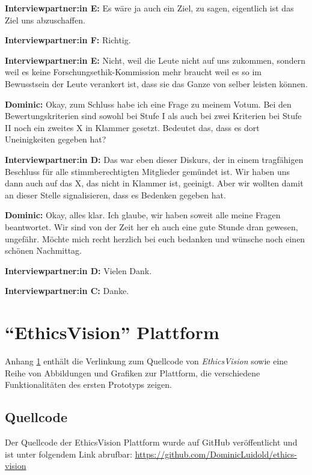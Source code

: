 \documentclass[a4paper,12pt,twoside]{scrreprt}
\begin{document}
\textbf{Interviewpartner:in E:} Es wäre ja auch ein Ziel, zu sagen, eigentlich ist das Ziel uns abzuschaffen.

\textbf{Interviewpartner:in F:} Richtig.

\textbf{Interviewpartner:in E:} Nicht, weil die Leute nicht auf uns zukommen, sondern weil es keine Forschungsethik-Kommission mehr braucht weil es so im Bewusstsein der Leute verankert ist, dass sie das Ganze von selber leisten können.

\textbf{Dominic:} Okay, zum Schluss habe ich eine Frage zu meinem Votum. Bei den Bewertungskriterien sind sowohl bei Stufe I als auch bei zwei Kriterien bei Stufe II noch ein zweites X in Klammer gesetzt. Bedeutet das, dass es dort Uneinigkeiten gegeben hat?

\textbf{Interviewpartner:in D:} Das war eben dieser Diskurs, der in einem tragfähigen Beschluss für alle stimmberechtigten Mitglieder gemündet ist. Wir haben uns dann auch auf das X, das nicht in Klammer ist, geeinigt. Aber wir wollten damit an dieser Stelle signalisieren, dass es Bedenken gegeben hat.

\textbf{Dominic:} Okay, alles klar. Ich glaube, wir haben soweit alle meine Fragen beantwortet. Wir sind von der Zeit her eh auch eine gute Stunde dran gewesen, ungefähr. Möchte mich recht herzlich bei euch bedanken und wünsche noch einen schönen Nachmittag.

\textbf{Interviewpartner:in D:} Vielen Dank.

\textbf{Interviewpartner:in C:} Danke.

\cleardoublepage
\chapter{\enquote{EthicsVision} Plattform}
\label{appendix:ethics-vision}

Anhang \ref{appendix:ethics-vision} enthält die Verlinkung zum Quellcode von \textit{EthicsVision} sowie eine Reihe von Abbildungen und Grafiken zur Plattform, die verschiedene Funktionalitäten des ersten Prototyps zeigen.

\section{Quellcode}
\label{appendix:ethics-vision-quellcode}

Der Quellcode der EthicsVision Plattform wurde auf GitHub veröffentlicht und ist unter folgendem Link abrufbar: \url{https://github.com/DominicLuidold/ethics-vision}
\end{document}
